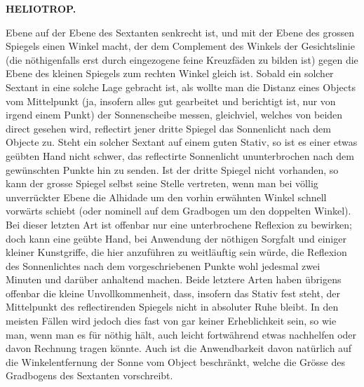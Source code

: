 \par\clearpage
\noindent\null\hfill{\small\textbf{HELIOTROP.}}\hfill{}\par\medskip
\noindent Ebene auf der Ebene des Sextanten senkrecht ist, und mit der Ebene des grossen Spiegels einen Winkel macht, der dem Complement des Winkels der Gesichtslinie (die nöthigenfalls erst durch eingezogene feine Kreuzfäden zu bilden ist) gegen die Ebene des kleinen Spiegels zum rechten Winkel gleich ist. Sobald ein solcher Sextant in eine solche Lage gebracht ist, als wollte man die Distanz eines Objects vom Mittelpunkt (ja, insofern alles gut gearbeitet und berichtigt ist, nur von irgend einem Punkt) der Sonnenscheibe messen, gleichviel, welches von beiden direct gesehen wird, reflectirt jener dritte Spiegel das Sonnenlicht nach dem Objecte zu. Steht ein solcher Sextant auf einem guten Stativ, so ist es einer etwas geübten Hand nicht schwer, das reflectirte Sonnenlicht ununterbrochen nach dem gewünschten Punkte hin zu senden. Ist der dritte Spiegel nicht vorhanden, so kann der grosse Spiegel selbst seine Stelle vertreten, wenn man bei völlig unverrückter Ebene die Alhidade um den vorhin erwähnten Winkel schnell vorwärts schiebt (oder nominell auf dem Gradbogen um den doppelten Winkel). Bei dieser letzten Art ist offenbar nur eine unterbrochene Reflexion zu bewirken; doch kann eine geübte Hand, bei Anwendung der nöthigen Sorgfalt und einiger kleiner Kunstgriffe, die hier anzuführen zu weitläuftig sein würde, die Reflexion des Sonnenlichtes nach dem vorgeschriebenen Punkte wohl jedesmal zwei Minuten und darüber anhaltend machen. Beide letztere Arten haben übrigens offenbar die kleine Unvollkommenheit, dass, insofern das Stativ fest steht, der Mittelpunkt des reflectirenden Spiegels nicht in absoluter Ruhe bleibt. In den meisten Fällen wird jedoch dies fast von gar keiner Erheblichkeit sein, so wie man, wenn man es für nöthig hält, auch leicht fortwährend etwas nachhelfen oder davon Rechnung tragen könnte. Auch ist die Anwendbarkeit davon natürlich auf die Winkelentfernung der Sonne vom Object beschränkt, welche die Grösse des Gradbogens des Sextanten vorschreibt.


